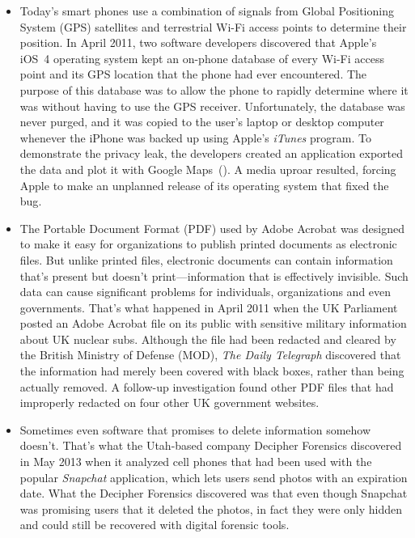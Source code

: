\begin{itemize}
\item Today's smart phones use a combination of signals from Global
  Positioning System (GPS) satellites and terrestrial Wi-Fi access
  points to determine their position. In April 2011, two software
  developers discovered that Apple's iOS~4 operating system kept an
  on-phone database of every Wi-Fi access point and its GPS location
  that the phone had ever encountered. The purpose of this database
  was to allow the phone to rapidly determine where it was without
  having to use the GPS receiver. Unfortunately, the database was
  never purged, and it was copied to the user's laptop or desktop
  computer whenever the iPhone was backed up using Apple's
  \emph{iTunes} program\cite{apple-tracking}. To demonstrate the
  privacy leak, the developers created an application exported the
  data and plot it with Google Maps~(). A media uproar
  resulted, forcing Apple to make an unplanned release of its
  operating system that fixed the bug\cite{apple-tracking-statement}.

\item The Portable Document Format (PDF) used by Adobe Acrobat was
  designed to make it easy for organizations to publish printed
  documents as electronic files. But unlike printed files, electronic
  documents can contain information that's present but doesn't
  print---information that is effectively invisible. Such data can
  cause significant problems for individuals, organizations and even
  governments. That's what happened in April 2011 when the UK
  Parliament posted an Adobe Acrobat file on its public with sensitive
  military information about UK nuclear subs. Although the file had
  been redacted and cleared by the British Ministry of Defense (MOD),
  \emph{The Daily Telegraph} discovered that the information had
  merely been covered with black boxes, rather than being actually
  removed.\label{uk-mod} A follow-up investigation found other PDF
  files that had improperly redacted on four other UK government
  websites\cite{telegraph-april2011-secrets}.

\item Sometimes even software that promises to delete information
  somehow doesn't. That's what the Utah-based company Decipher
  Forensics discovered in May 2013 when it analyzed cell phones that
  had been used with the popular \emph{Snapchat} application, which
  lets users send photos with an expiration date. What the Decipher Forensics discovered was that even
  though Snapchat was promising users that it deleted the photos, in
  fact they were only hidden and could still be recovered with
  digital forensic tools\cite{ksl-snap-chat}.

\end{itemize}

